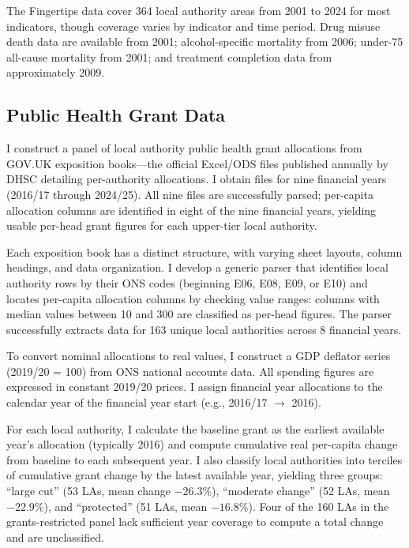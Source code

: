 \documentclass[12pt]{article}
\begin{document}
The Fingertips data cover 364 local authority areas from 2001 to 2024 for most indicators, though coverage varies by indicator and time period. Drug misuse death data are available from 2001; alcohol-specific mortality from 2006; under-75 all-cause mortality from 2001; and treatment completion data from approximately 2009.

\subsection{Public Health Grant Data}

I construct a panel of local authority public health grant allocations from GOV.UK exposition books---the official Excel/ODS files published annually by DHSC detailing per-authority allocations. I obtain files for nine financial years (2016/17 through 2024/25). All nine files are successfully parsed; per-capita allocation columns are identified in eight of the nine financial years, yielding usable per-head grant figures for each upper-tier local authority.

Each exposition book has a distinct structure, with varying sheet layouts, column headings, and data organization. I develop a generic parser that identifies local authority rows by their ONS codes (beginning E06, E08, E09, or E10) and locates per-capita allocation columns by checking value ranges: columns with median values between 10 and 300 are classified as per-head figures. The parser successfully extracts data for 163 unique local authorities across 8 financial years.

To convert nominal allocations to real values, I construct a GDP deflator series (2019/20 = 100) from ONS national accounts data. All spending figures are expressed in constant 2019/20 prices. I assign financial year allocations to the calendar year of the financial year start (e.g., 2016/17 $\rightarrow$ 2016).

For each local authority, I calculate the baseline grant as the earliest available year's allocation (typically 2016) and compute cumulative real per-capita change from baseline to each subsequent year. I also classify local authorities into terciles of cumulative grant change by the latest available year, yielding three groups: ``large cut'' (53 LAs, mean change $-26.3\%$), ``moderate change'' (52 LAs, mean $-22.9\%$), and ``protected'' (51 LAs, mean $-16.8\%$). Four of the 160 LAs in the grants-restricted panel lack sufficient year coverage to compute a total change and are unclassified.
\end{document}
